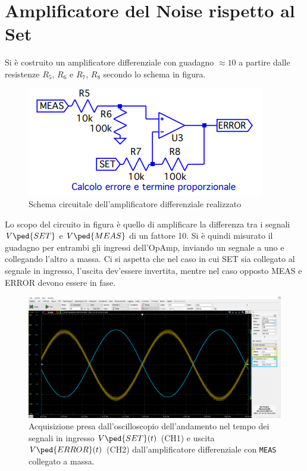 \documentclass[10pt, a4paper, italian]{article}
\begin{document}
\section{Amplificatore del Noise rispetto al Set}
Si è costruito un amplificatore differenziale con guadagno $\approx 10$ a
partire dalle resistenze $R_5$, $R_6$ e $R_7$, $R_8$ secondo lo schema in
figura.
\begin{figure}[htbp]
    \centering
	\includegraphics[scale=0.8]{errorgen}
    \caption{Schema circuitale dell'amplificatore differenziale realizzato
    \label{schm: errgen}}
\end{figure}
Lo scopo del circuito in figura è quello di amplificare la differenza tra i
segnali $V\ped{SET}$ e $V\ped{MEAS}$ di un fattore 10.
Si è quindi misurato il guadagno per entrambi gli ingressi dell'OpAmp,
inviando un segnale a uno e collegando l'altro a massa. Ci si aspetta che nel
caso in cui SET sia collegato al segnale in ingresso, l'uscita dev'essere
invertita, mentre nel caso opposto MEAS e ERROR devono essere in fase.
\begin{figure}[htbp]
    \centering
	\includegraphics[scale=0.4]{error.set}
    \caption{Acquisizione presa dall'oscilloscopio dell'andamento nel tempo dei
	segnali in ingresso $V\ped{SET} (t)$ (CH1) e uscita $V\ped{ERROR} (t)$ (CH2)
	dall'amplificatore differenziale con \texttt{MEAS} collegato a massa.
    \label{fig: errset}}
\end{figure}
\end{document}
